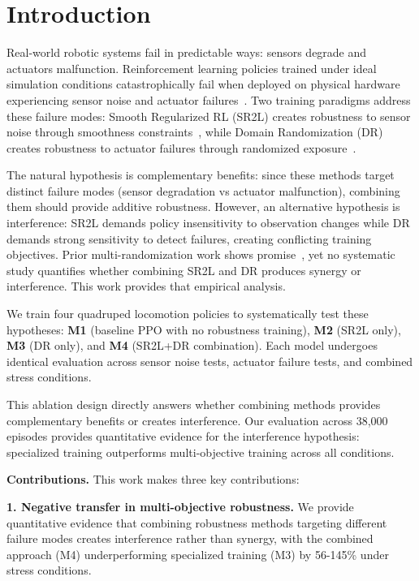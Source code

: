 \documentclass[conference]{IEEEtran}
\begin{document}
\section{Introduction}

Real-world robotic systems fail in predictable ways: sensors degrade and actuators malfunction. Reinforcement learning policies trained under ideal simulation conditions catastrophically fail when deployed on physical hardware experiencing sensor noise and actuator failures~\cite{hwangbo2019learning,miki2022learning,kumar2021rma,peng2018sim,tobin2017domain}. Two training paradigms address these failure modes: Smooth Regularized RL (SR2L) creates robustness to sensor noise through smoothness constraints~\cite{shen2020deep}, while Domain Randomization (DR) creates robustness to actuator failures through randomized exposure~\cite{tobin2017domain,peng2018sim}.

The natural hypothesis is complementary benefits: since these methods target distinct failure modes (sensor degradation vs actuator malfunction), combining them should provide additive robustness. However, an alternative hypothesis is interference: SR2L demands policy insensitivity to observation changes while DR demands strong sensitivity to detect failures, creating conflicting training objectives. Prior multi-randomization work shows promise~\cite{mehta2020active}, yet no systematic study quantifies whether combining SR2L and DR produces synergy or interference. This work provides that empirical analysis.

We train four quadruped locomotion policies to systematically test these hypotheses: \textbf{M1} (baseline PPO with no robustness training), \textbf{M2} (SR2L only), \textbf{M3} (DR only), and \textbf{M4} (SR2L+DR combination). Each model undergoes identical evaluation across sensor noise tests, actuator failure tests, and combined stress conditions.

This ablation design directly answers whether combining methods provides complementary benefits or creates interference. Our evaluation across 38,000 episodes provides quantitative evidence for the interference hypothesis: specialized training outperforms multi-objective training across all conditions.

\textbf{Contributions.} This work makes three key contributions:

\textbf{1. Negative transfer in multi-objective robustness.} We provide quantitative evidence that combining robustness methods targeting different failure modes creates interference rather than synergy, with the combined approach (M4) underperforming specialized training (M3) by 56-145\% under stress conditions.
\end{document}
